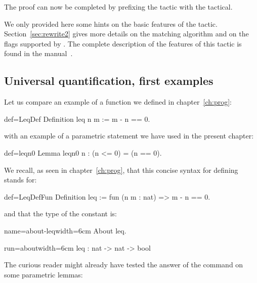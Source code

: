 The proof can now be completed by prefixing the tactic with the
 tactical.

We only provided here some hints on the basic features of the 
tactic. Section~\ref{sec:rewrite2} gives more details on the matching
algorithm and on the flags supported by . The complete
description of the features of this tactic is found
in the manual~\cite{ssrman}.



\subsection{Universal quantification, first examples}

Let us compare an example of a function we defined in
chapter~\ref{ch:prog}:

\begin{coq}{def=LeqDef}{}
Definition leq n m := m - n == 0.
\end{coq}
with an example of a parametric statement we have used in the present
chapter:

\begin{coq}{def=leqn0}{}
Lemma leqn0 n : (n <= 0) = (n == 0).
\end{coq}

We recall, as seen in chapter~\ref{ch:prog}, that this concise syntax
for defining  stands for:

\begin{coq}{def=LeqDefFun}{}
Definition leq := fun (n m : nat) => m - n == 0.
\end{coq}
and that the type of the constant  is:

\begin{coq}{name=about-leq}{width=6cm}
About leq.
\end{coq}
\begin{coqout}{run=about}{width=6cm}
leq : nat -> nat -> bool
\end{coqout}

The curious reader might already have tested the answer of the
 command on some parametric lemmas:

